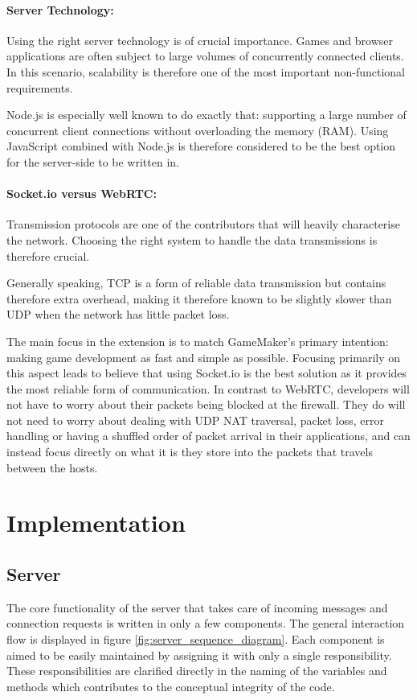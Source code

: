 \documentclass[bsc,frontabs,twoside,singlespacing,parskip,deptreport]{infthesis}     %
\begin{document}
\paragraph*{Server Technology:}
Using the right server technology is of crucial importance. Games and browser applications are often subject to large volumes of concurrently connected clients. In this scenario, scalability is therefore one of the most important non-functional requirements. 

Node.js is especially well known to do exactly that: supporting a large number of concurrent client connections without overloading the memory (RAM). Using JavaScript combined with Node.js is therefore considered to be the best option for the server-side to be written in.

\paragraph*{Socket.io versus WebRTC:}
Transmission protocols are one of the contributors that will heavily characterise the network. Choosing the right system to handle the data transmissions is therefore crucial. 
 
Generally speaking, TCP is a form of reliable data transmission but contains therefore extra overhead, making it therefore known to be slightly slower than UDP when the network has little packet loss.

The main focus in the extension is to match GameMaker's primary intention: making game development as fast and simple as possible. Focusing primarily on this aspect leads to believe that using Socket.io is the best solution as it provides the most reliable form of communication. In contrast to WebRTC, developers will not have to worry about their packets being blocked at the firewall. They do will not need to worry about dealing with UDP NAT traversal, packet loss, error handling or having a shuffled order of packet arrival in their applications, and can instead focus directly on what it is they store into the packets that travels between the hosts.

\section{Implementation}
\subsection{Server}
The core functionality of the server that takes care of incoming messages and connection requests is written in only a few components. The general interaction flow is displayed in figure \ref{fig:server_sequence_diagram}. Each component is aimed to be easily maintained by assigning it with only a single responsibility. These responsibilities are clarified directly in the naming of the variables and methods which contributes to the conceptual integrity of the code.
\end{document}
